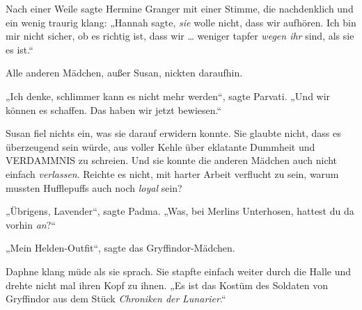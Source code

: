 Nach einer Weile sagte Hermine Granger mit einer Stimme, die nachdenklich und ein wenig traurig klang:
„Hannah sagte, \emph{sie} wolle nicht, dass wir aufhören. Ich bin mir nicht sicher, ob es richtig ist, dass wir … weniger tapfer \emph{wegen ihr} sind, als sie es ist.“

Alle anderen Mädchen, außer Susan, nickten daraufhin.

„Ich denke, schlimmer kann es nicht mehr werden“, sagte Parvati.
„Und wir können es schaffen. Das haben wir jetzt bewiesen.“

Susan fiel nichts ein, was sie darauf erwidern konnte. Sie glaubte nicht, dass es überzeugend sein würde, aus voller Kehle über eklatante Dummheit und VERDAMMNIS zu schreien. Und sie konnte die anderen Mädchen auch nicht einfach \emph{verlassen}. Reichte es nicht, mit harter Arbeit verflucht zu sein, warum mussten Hufflepuffs auch noch \emph{loyal} sein?

„Übrigens, Lavender“, sagte Padma.
„Was, bei Merlins Unterhosen, hattest du da vorhin \emph{an}?“

„Mein Helden-Outfit“, sagte das Gryffindor-Mädchen.

Daphne klang müde als sie sprach. Sie stapfte einfach weiter durch die Halle und drehte nicht mal ihren Kopf zu ihnen.
„Es ist das Kostüm des Soldaten von Gryffindor aus dem Stück \emph{Chroniken der} \emph{Lunarier}.“%

